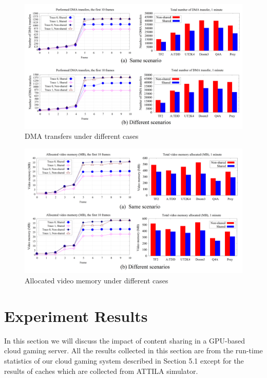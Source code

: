 \documentclass[pageno]{jpaper}
\begin{document}
 \begin{figure}
\centering
\includegraphics[width=7in]{pics/12.png}
\caption{DMA transfers under different cases}
\label{fig:result1}
\end{figure}

  \begin{figure}
\centering
\includegraphics[width=7in]{pics/34.png}
\caption{Allocated video memory under different cases}
\label{fig:result2}
\end{figure}


\section{Experiment Results}\label{sec:simulation}

In this section we will discuss the impact of content sharing in a GPU-based cloud gaming server.
All the results collected in this section are from the run-time statistics of our cloud gaming system described in Section 5.1 except for the results of caches which are collected from ATTILA simulator.
\end{document}
